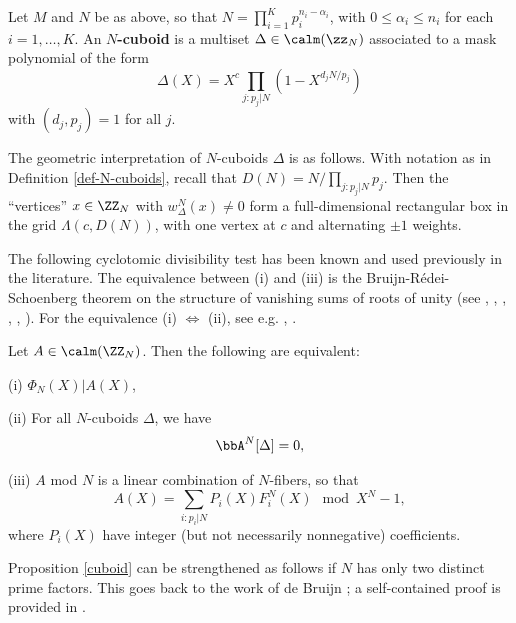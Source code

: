 \begin{definition}
\label{def-N-cuboids}
Let $M$ and $N$ be as above, so that $N=\prod_{i=1}^K p_i^{n_i-\alpha_i}$, with $0\leq \alpha_i\leq n_i$ for each $i=1,\dots,K$. An \textbf{$N$-cuboid} is a multiset $\Delta \in \calm (\zz_N)$ associated to a mask polynomial of the form
\begin{equation}\label{def-delta}
\Delta(X)= X^c\prod_{j:p_j|N} (1-X^{d_jN/p_j})
\end{equation}
 with $(d_j,p_j)=1$ for all $j$. 
\end{definition} 
 


The geometric interpretation of $N$-cuboids $\Delta$ is as follows. With notation as in Definition \ref{def-N-cuboids}, 
recall that $D(N)=N/\prod_{j:p_j|N}p_j$. Then the ``vertices'' $x\in\ZZ_N$ with $ w^N_\Delta(x)\neq 0$ form a full-dimensional rectangular box in the grid $\Lambda(c,D(N))$, with one vertex at $c$ and alternating $\pm 1$ weights. 



The following cyclotomic divisibility test has been known and used previously in the literature. The equivalence between (i) and (iii) is the Bruijn-R\'edei-Schoenberg theorem on the structure of vanishing sums of roots of unity (see \cite{deB}, \cite{LL}, \cite{Mann}, \cite{Re1}, \cite{Re2}, \cite{schoen}). For the equivalence (i) $\Leftrightarrow$ (ii), see e.g.  \cite[Section 3]{Steinberger}, \cite[Section 3]{KMSV}.


\begin{proposition}\label{cuboid}
Let $A\in\calm(\ZZ_N)$. Then the following are equivalent:

\medskip

(i) $\Phi_N(X)|A(X)$,


\medskip

(ii) For all $N$-cuboids $\Delta$, we have
\begin{equation}\label{id-3a}
\bbA^N[\Delta]=0,
\end{equation}

\medskip

(iii) $A$ mod $N$ is a linear combination of $N$-fibers, so that
$$A(X)=\sum_{i:p_i|N} P_i(X)F^N_i(X) \mod X^N-1,$$
where $P_i(X)$ have integer (but not necessarily nonnegative) coefficients.
\end{proposition}

Proposition \ref{cuboid} can be strengthened as follows if $N$ has only two distinct prime factors. This goes back to the work of de Bruijn \cite{deB}; a self-contained proof is provided in \cite[Theorem 3.3]{LL}.

